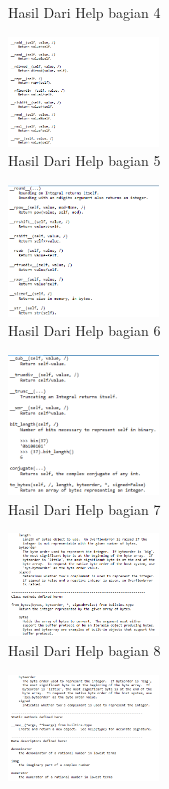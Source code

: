 \begin{enumerate}
\begin{figure}[H]
        \centering
        \caption{Hasil Dari Help bagian 4}
    \end{figure}
    \begin{figure}[H]
        \includegraphics[width=4cm]{figures/kelompok3/1/5.png}
        \centering
        \caption{Hasil Dari Help bagian 5}
    \end{figure}
    \begin{figure}[H]
        \includegraphics[width=4cm]{figures/kelompok3/1/6.png}
        \centering
        \caption{Hasil Dari Help bagian 6}
    \end{figure}
    \begin{figure}[H]
        \includegraphics[width=4cm]{figures/kelompok3/1/7.png}
        \centering
        \caption{Hasil Dari Help bagian 7}
    \end{figure}
    \begin{figure}[H]
        \includegraphics[width=4cm]{figures/kelompok3/1/8.png}
        \centering
        \caption{Hasil Dari Help bagian 8}
    \end{figure}
    \begin{figure}[H]
        \includegraphics[width=4cm]{figures/kelompok3/1/9.png}

\end{figure}
\end{enumerate}
